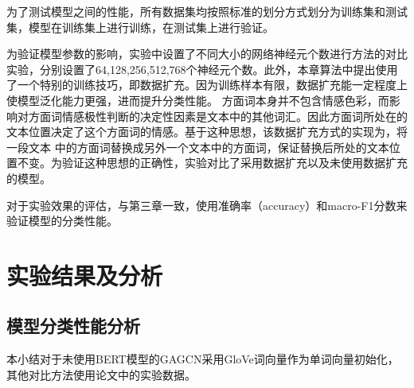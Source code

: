 为了测试模型之间的性能，所有数据集均按照标准的划分方式划分为训练集和测试集，模型在训练集上进行训练，在测试集上进行验证。

为验证模型参数的影响，实验中设置了不同大小的网络神经元个数进行方法的对比实验，分别设置了64,128,256,512,768个神经元个数。此外，本章算法中提出使用了一个特别的训练技巧，即数据扩充。因为训练样本有限，数据扩充能一定程度上使模型泛化能力更强，进而提升分类性能。
方面词本身并不包含情感色彩，而影响对方面词情感极性判断的决定性因素是文本中的其他词汇。因此方面词所处在的文本位置决定了这个方面词的情感。基于这种思想，该数据扩充方式的实现为，将一段文本
中的方面词替换成另外一个文本中的方面词，保证替换后所处的文本位置不变。为验证这种思想的正确性，实验对比了采用数据扩充以及未使用数据扩充的模型。

对于实验效果的评估，与第三章一致，使用准确率（accuracy）和macro-F1分数来验证模型的分类性能。

\section{实验结果及分析}
\subsection{模型分类性能分析}
本小结对于未使用BERT模型的GAGCN采用GloVe词向量作为单词向量初始化，其他对比方法使用论文中的实验数据。

